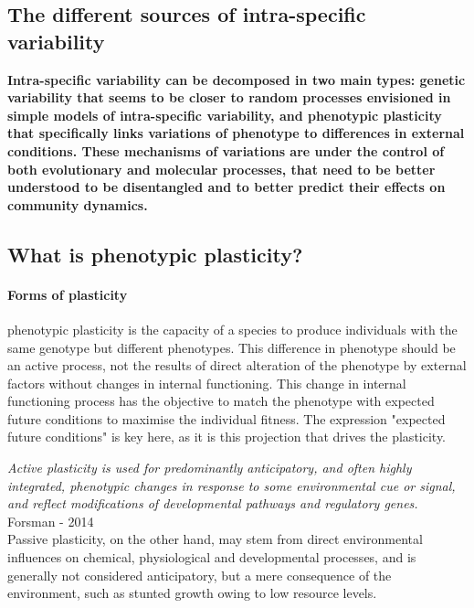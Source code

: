 \subsection{The different sources of intra-specific variability}


\textbf{Intra-specific variability can be decomposed in two main types: genetic variability that seems to be closer to random processes envisioned in simple models of intra-specific variability, and phenotypic plasticity that specifically links variations of phenotype to differences in external conditions. These mechanisms of variations are under the control of both evolutionary and molecular processes, that need to be better understood to be disentangled and to better predict their effects on community dynamics.}

\subsection{What is phenotypic plasticity?}

\paragraph{Forms of plasticity}
phenotypic plasticity is the capacity of a species to produce individuals with the same genotype but different phenotypes. This difference in phenotype should be an active process, not the results of direct alteration of the phenotype by external factors without changes in internal functioning. This change in internal functioning process has the objective  to match the phenotype with expected future conditions to maximise the individual fitness. The expression "expected future conditions" is key here, as it is this projection that drives the plasticity.

\textit{Active plasticity is used for predominantly anticipatory, and often highly integrated, phenotypic changes in response to some environmental cue or signal, and reflect modifications of developmental pathways and regulatory genes.} Forsman - 2014\\


Passive plasticity, on the other hand, may stem from direct environmental influences on chemical, physiological and developmental processes, and is generally not considered anticipatory, but a mere consequence of the environment, such as stunted growth owing to low resource levels.\\



